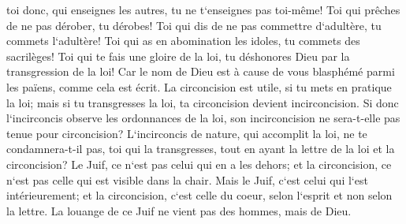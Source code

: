 \verse toi donc, qui enseignes les autres, tu ne t`enseignes pas toi-même! Toi qui prêches de ne pas dérober, tu dérobes! 
\verse Toi qui dis de ne pas commettre d`adultère, tu commets l`adultère! Toi qui as en abomination les idoles, tu commets des sacrilèges! 
\verse Toi qui te fais une gloire de la loi, tu déshonores Dieu par la transgression de la loi! 
\verse Car le nom de Dieu est à cause de vous blasphémé parmi les païens, comme cela est écrit. 
\verse La circoncision est utile, si tu mets en pratique la loi; mais si tu transgresses la loi, ta circoncision devient incirconcision. 
\verse Si donc l`incirconcis observe les ordonnances de la loi, son incirconcision ne sera-t-elle pas tenue pour circoncision? 
\verse L`incirconcis de nature, qui accomplit la loi, ne te condamnera-t-il pas, toi qui la transgresses, tout en ayant la lettre de la loi et la circoncision? 
\verse Le Juif, ce n`est pas celui qui en a les dehors; et la circoncision, ce n`est pas celle qui est visible dans la chair. 
\verse Mais le Juif, c`est celui qui l`est intérieurement; et la circoncision, c`est celle du coeur, selon l`esprit et non selon la lettre. La louange de ce Juif ne vient pas des hommes, mais de Dieu. 

